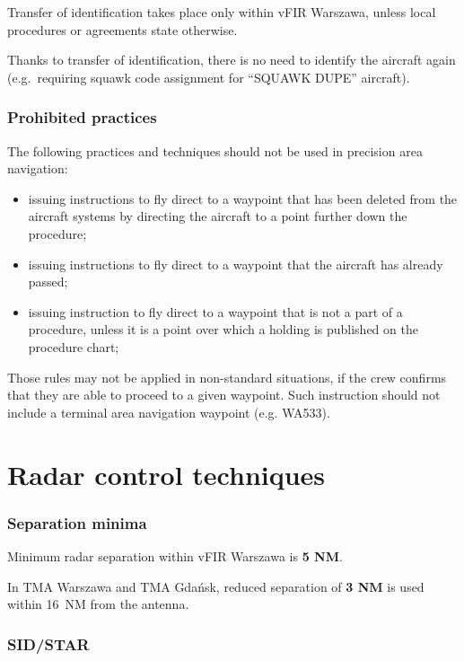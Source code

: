Transfer of identification takes place only within vFIR Warszawa, unless local
procedures or agreements state otherwise.

Thanks to transfer of identification, there is no need to identify the aircraft
again (e.g.\ requiring squawk code assignment for ``SQUAWK DUPE'' aircraft).

\subsubsection{Prohibited practices}

The following practices and techniques should not be used in precision area
navigation:

\begin{itemize}
\item issuing instructions to fly direct to a waypoint that has been deleted
from the aircraft systems by directing the aircraft to a point further down the
procedure;
\item issuing instructions to fly direct to a waypoint that the aircraft has
already passed;
\item issuing instruction to fly direct to a waypoint that is not a part of a
procedure, unless it is a point over which a holding is published on the
procedure chart;
\end{itemize}

Those rules may not be applied in non-standard situations, if the crew confirms
that they are able to proceed to a given waypoint. Such instruction should not
include a terminal area navigation waypoint (e.g. WA533).

\section{Radar control techniques}

\subsubsection{Separation minima}

Minimum radar separation within vFIR Warszawa is \textbf{5 NM}.

In TMA Warszawa and TMA Gdańsk, reduced separation of \textbf{3 NM} is used
within 16~NM from the antenna.

\subsubsection{SID/STAR}

